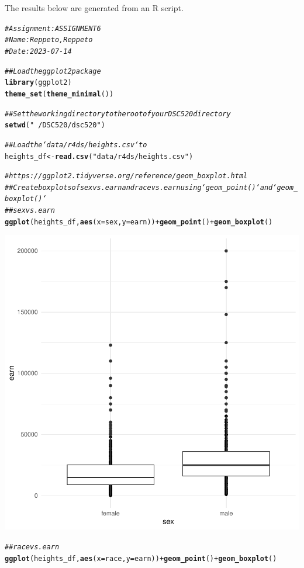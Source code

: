 \documentclass{article}\usepackage[]{graphicx}\usepackage[]{xcolor}
\makeatletter
\newcommand{\hlstr}[1]{\textcolor[rgb]{0.192,0.494,0.8}{#1}}%
\newcommand{\hlcom}[1]{\textcolor[rgb]{0.678,0.584,0.686}{\textit{#1}}}%
\newcommand{\hlopt}[1]{\textcolor[rgb]{0,0,0}{#1}}%
\newcommand{\hlstd}[1]{\textcolor[rgb]{0.345,0.345,0.345}{#1}}%
\newcommand{\hlkwb}[1]{\textcolor[rgb]{0.69,0.353,0.396}{#1}}%
\newcommand{\hlkwc}[1]{\textcolor[rgb]{0.333,0.667,0.333}{#1}}%
\newcommand{\hlkwd}[1]{\textcolor[rgb]{0.737,0.353,0.396}{\textbf{#1}}}%
\newenvironment{kframe}{%
 \def\at@end@of@kframe{}%
 \ifinner\ifhmode%
  \def\at@end@of@kframe{\end{minipage}}%
  \begin{minipage}{\columnwidth}%
 \fi\fi%
 \def\FrameCommand##1{\hskip\@totalleftmargin \hskip-\fboxsep
 \colorbox{shadecolor}{##1}\hskip-\fboxsep
     \hskip-\linewidth \hskip-\@totalleftmargin \hskip\columnwidth}%
 \MakeFramed {\advance\hsize-\width
   \@totalleftmargin\z@ \linewidth\hsize
   \@setminipage}}%
 {\par\unskip\endMakeFramed%
 \at@end@of@kframe}
\newenvironment{knitrout}{}{} %
\makeatother
\begin{document}
The results below are generated from an R script.

\begin{knitrout}
\color{fgcolor}\begin{kframe}
\begin{alltt}
\hlcom{# Assignment: ASSIGNMENT 6}
\hlcom{# Name: Reppeto, Reppeto}
\hlcom{# Date: 2023-07-14}

\hlcom{## Load the ggplot2 package}
\hlkwd{library}\hlstd{(ggplot2)}
\hlkwd{theme_set}\hlstd{(}\hlkwd{theme_minimal}\hlstd{())}

\hlcom{## Set the working directory to the root of your DSC 520 directory}
\hlkwd{setwd}\hlstd{(}\hlstr{"~/DSC520/dsc520"}\hlstd{)}

\hlcom{## Load the `data/r4ds/heights.csv` to}
\hlstd{heights_df} \hlkwb{<-} \hlkwd{read.csv}\hlstd{(}\hlstr{"data/r4ds/heights.csv"}\hlstd{)}

\hlcom{# https://ggplot2.tidyverse.org/reference/geom_boxplot.html}
\hlcom{## Create boxplots of sex vs. earn and race vs. earn using `geom_point()` and `geom_boxplot()`}
\hlcom{## sex vs. earn}
\hlkwd{ggplot}\hlstd{(heights_df,} \hlkwd{aes}\hlstd{(}\hlkwc{x}\hlstd{=sex,} \hlkwc{y}\hlstd{=earn))} \hlopt{+} \hlkwd{geom_point}\hlstd{()}\hlopt{+} \hlkwd{geom_boxplot}\hlstd{()}
\end{alltt}
\end{kframe}

{\centering \includegraphics[width=.6\linewidth]{figure/assignment-06-ReppetoBrian-Rnwauto-report-1} 

}


\begin{kframe}\begin{alltt}
\hlcom{## race vs. earn}
\hlkwd{ggplot}\hlstd{(heights_df,} \hlkwd{aes}\hlstd{(}\hlkwc{x}\hlstd{=race,} \hlkwc{y}\hlstd{=earn))} \hlopt{+} \hlkwd{geom_point}\hlstd{()}\hlopt{+} \hlkwd{geom_boxplot}\hlstd{()}
\end{alltt}
\end{kframe}


\end{knitrout}
\end{document}
